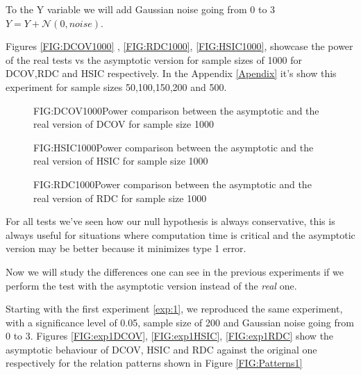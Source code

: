 To the Y variable we will add  Gaussian noise going from 0 to 3
$ Y = Y + \mathcal{N}(0,noise) $.

Figures \ref{FIG:DCOV1000} , \ref{FIG:RDC1000}, \ref{FIG:HSIC1000}, showcase the power of the real tests vs the asymptotic version for sample sizes of 1000  for DCOV,RDC and HSIC respectively. In the Appendix \ref{Apendix} it's show this experiment for sample sizes 50,100,150,200 and 500.

\begin{figure}[DCOV asymptotic size 1000]{FIG:DCOV1000}{Power comparison between the asymptotic and the real version of DCOV for sample size 1000}
\end{figure}
\begin{figure}[HSIC asymptotic size 1000]{FIG:HSIC1000}{Power comparison between the asymptotic and the real version of HSIC for sample size 1000}
\end{figure}
\begin{figure}[RDC asymptotic size 1000]{FIG:RDC1000}{Power comparison between the asymptotic and the real version of RDC for sample size 1000}
\end{figure}

For all tests we've seen how our null hypothesis is always conservative, this is always useful for situations where computation time is critical and the asymptotic version may be better because it minimizes type 1 error.

Now we will study the differences one can see in the previous experiments if we perform the test with the asymptotic version instead of the \textit{real} one.

Starting with the first experiment \ref{exp:1}, we reproduced the same experiment, with a significance level of 0.05, sample size of 200 and Gaussian noise going from 0 to 3. Figures \ref{FIG:exp1DCOV}, \ref{FIG:exp1HSIC}, \ref{FIG:exp1RDC} show the asymptotic behaviour of DCOV, HSIC and RDC against the original one respectively for the relation patterns shown in Figure \ref{FIG:Patterns1}

